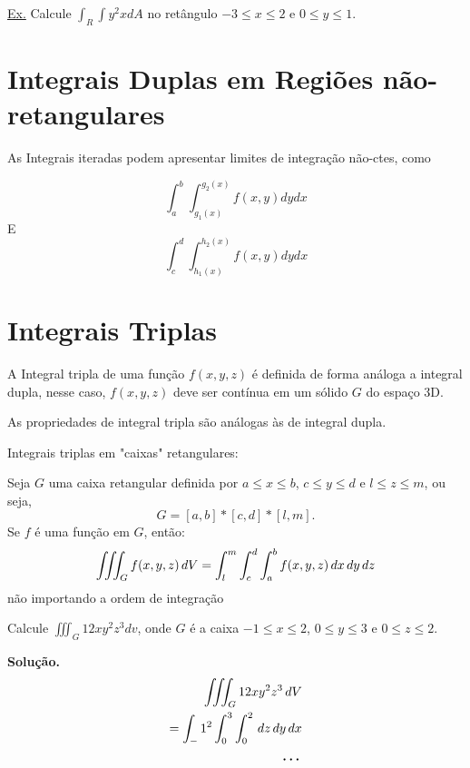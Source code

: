 \documentclass[portugues, 11pt]{article}
\begin{document}
	\underline{Ex.} Calcule $\int_R\int{y^2x}dA$ no retângulo $-3\leq x\leq 2$ e $0 \leq y \leq 1$.
	
	
	\section{Integrais Duplas em Regiões não-retangulares}
	As Integrais iteradas podem apresentar limites de integração não-ctes, como
	
	\begin{equation}
		\int_a^b\int_{g_{1}(x)}^{g_{2}(x)}{f(x,y) dydx}
	\end{equation}
	E
	\begin{equation}
		\int_c^d\int_{h_{1}(x)}^{h_{2}(x)}{f(x,y) dydx}
	\end{equation}
	
	
	\section{Integrais Triplas}
	A Integral tripla de uma função $f(x,y,z)$ é definida de forma análoga a integral dupla, nesse caso, $f(x,y,z)$ deve ser contínua em um sólido $G$ do espaço 3D.

	As propriedades de integral tripla são análogas às de integral dupla.

	Integrais triplas em "caixas" retangulares:

	\begin{thrm}
		Seja $G$ uma caixa retangular definida por $a\leq x \leq b$, $c \leq y \leq d$ e $l \leq z \leq m$, ou seja, 
		\begin{equation}
			G = [a,b]*[c,d]*[l,m].
		\end{equation}
		Se $f$ é uma função em $G$, então:
		\begin{equation}
			\iiint_G f(x,y,z) \,dV  \\
			= \int_l^m\int_c^d\int_a^b f(x,y,z) \,dx\,dy\,dz
		\end{equation}
		não importando a ordem de integração
	\end{thrm}

	\begin{exmp}
		Calcule $ \iiint_G {12xy^2z^3}{dv}$, onde $G$ é a caixa $-1 \leq x \leq 2$, $0 \leq y \leq 3$ e $0 \leq z \leq 2$.
		
		\textbf{Solução.}
		\begin{align*}
			\iiint_G 12xy^2z^3 \,dV \\
			= \int_-1^2\int_0^3\int_0^2 \,dz\,dy\,dx \\
			\textbf{\dots}
		\end{align*}
		

	\end{exmp}
	
\end{document}

